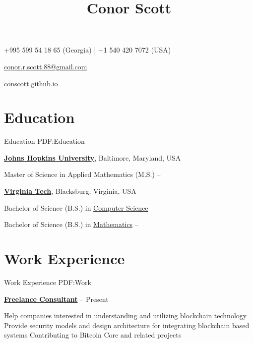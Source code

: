 \documentclass[a4paper,10pt,oneside]{article}
\begin{document}
\begin{minipage}[t][0pt]{\linewidth}


\title{Conor Scott}

\begin{subtitle}
+995 599 54 18 65 (Georgia) | +1 540 420 7072 (USA)
\par
\href{mailto:conor.r.scott.88@gmail.com}
{conor.r.scott.88@gmail.com}
\par
\href{https://conscott.github.io}
{conscott.github.io}
\end{subtitle}
\begin{body}


\section
{Education}
{Education}
{PDF:Education}

\href{https://www.jhu.edu/}
{\textbf{Johns Hopkins University}},
Baltimore, Maryland, USA

\SmallEntryGap
Master of Science in Applied Mathematics (M.S.)
\hfill
{} --

\EntryGap
\href{https://www.vt.edu/}
{\textbf{Virginia Tech}},
Blacksburg, Virginia, USA
\par
Bachelor of Science (B.S.) in
\href{https://www.cs.vt.edu/}
{Computer Science}
\par
Bachelor of Science (B.S.) in
\href{https://www.math.vt.edu/}
{Mathematics}
\hfill
{} --

\section
{Work Experience}
{Work Experience}
{PDF:Work}

\href{https://conscott.github.io}
{\textbf{Freelance Consultant}}
\hfill
{} -- Present
\begin{detail}
\BulletItem Help companies interested in understanding and utilizing blockchain technology
\BulletItem Provide security models and design architecture for integrating blockchain based systems
\BulletItem Contributing to Bitcoin Core and related projects
\end{detail}



\end{body}
\end{minipage}
\end{document}
